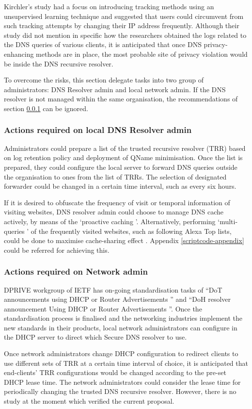 Kirchler's study had a focus on introducing tracking methods using an unsupervised learning technique and suggested that users could circumvent from such tracking attempts by changing their IP address frequently.
Although their study did not mention in specific how the researchers obtained the logs related to the DNS queries of various clients, it is anticipated that once DNS privacy-enhancing methods are in place, the most probable site of privacy violation would be inside the DNS recursive resolver.

To overcome the risks, this section delegate tasks into two group of administrators: DNS Resolver admin and local network admin.
If the DNS resolver is not managed within the same organisation, the recommendations of section \ref{dnsresolveradmin} can be ignored.

\subsubsection{Actions required on local DNS Resolver admin}\label{dnsresolveradmin}
Administrators could prepare a list of the trusted recursive resolver (TRR) based on log retention policy and deployment of QName minimisation.
Once the list is prepared, they could configure the local server to forward DNS queries outside the organisation to ones from the list of TRRs.
The selection of designated forwarder could be changed in a certain time interval, such as every six hours.

If it is desired to obfuscate the frequency of visit or temporal information of visiting websites, DNS resolver admin could choose to manage DNS cache actively, by means of the `proactive caching \cite{cohen2003proactive}'. Alternatively, performing `multi-queries \cite{siby2018dns}' of the frequently visited websites, such as following Alexa Top lists, could be done to maximise cache-sharing effect \cite{wang2013analysis}. Appendix \ref{scriptcode-appendix} could be referred for achieving this.

\subsubsection{Actions required on Network admin}
DPRIVE workgroup of IETF has on-going standardisation tasks of ``DoT announcements using DHCP or Router Advertisements \cite{peterson-dot-dhcp-00}'' and ``DoH resolver announcement Using DHCP or Router Advertisements \cite{peterson-doh-dhcp-00}''.
Once the standardisation process is finalised and the networking industries implement the new standards in their products, local network administrators can configure in the DHCP server to direct which Secure DNS resolver to use.

Once network administrators change DHCP configuration to redirect clients to use different sets of TRR at a certain time interval of choice, it is anticipated that end-clients' TRR configurations would be changed according to the pre-set DHCP lease time. The network administrators could consider the lease time for periodically changing the trusted DNS recursive resolver. However, there is no study at the moment which verified the current proposal.